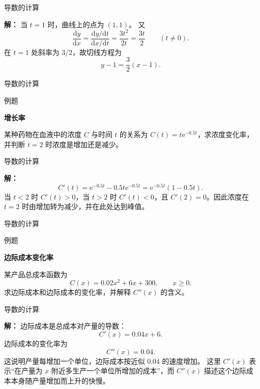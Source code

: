 \documentclass[aspectratio=169,10pt,fontset=fandol]{ctexbeamer}
\newcommand{\dd}{\mathrm{d}}
\newcommand{\ee}{\mathrm{e}}
\begin{document}
\begin{frame}[t,fragile]{导数的计算}
\footnotesize
{\footnotesize
\textbf{解：}
当 $t=1$ 时，曲线上的点为 $(1,1)$。 又
\[
\frac{\dd y}{\dd x}
=\frac{\dd y/\dd t}{\dd x/\dd t}
=\frac{3t^2}{2t}
=\frac{3t}{2}\qquad(t\neq0).
\]
在 $t=1$ 处斜率为 $3/2$，故切线方程为
\[
y-1=\frac32(x-1).
\]

}
\end{frame}
\begin{frame}[t,fragile]{导数的计算}
\footnotesize
\begin{block}{例题}
{\footnotesize
\textbf{增长率}\par

某种药物在血液中的浓度 $C$ 与时间 $t$ 的关系为 $C(t)=t\ee^{-0.5t}$，求浓度变化率，并判断 $t=2$ 时浓度是增加还是减少。

}
\end{block}
\end{frame}
\begin{frame}[t,fragile]{导数的计算}
\footnotesize
{\footnotesize
\textbf{解：}
\[
C'(t)=\ee^{-0.5t}-0.5t\ee^{-0.5t}=\ee^{-0.5t}(1-0.5t).
\]
当 \(t<2\) 时 \(C'(t)>0\)，当 \(t>2\) 时 \(C'(t)<0\)，且 \(C'(2)=0\)。因此浓度在 \(t=2\) 时由增加转为减少，并在此处达到峰值。

}
\end{frame}
\begin{frame}[t,fragile]{导数的计算}
\footnotesize
\begin{block}{例题}
{\footnotesize
\textbf{边际成本变化率}\par

某产品总成本函数为
\[
C(x)=0.02x^2+6x+300,\qquad x\geq0.
\]
求边际成本和边际成本的变化率，并解释 $C''(x)$ 的含义。

}
\end{block}
\end{frame}
\begin{frame}[t,fragile]{导数的计算}
\footnotesize
{\footnotesize
\textbf{解：}
边际成本是总成本对产量的导数：
\[
C'(x)=0.04x+6.
\]
边际成本的变化率为
\[
C''(x)=0.04.
\]
这说明产量每增加一个单位，边际成本按近似 $0.04$ 的速度增加。 这里 $C'(x)$ 表示“在产量为 $x$ 附近多生产一个单位所增加的成本”，而 $C''(x)$ 描述这个边际成本本身随产量增加而上升的快慢。

}
\end{frame}
\end{document}
